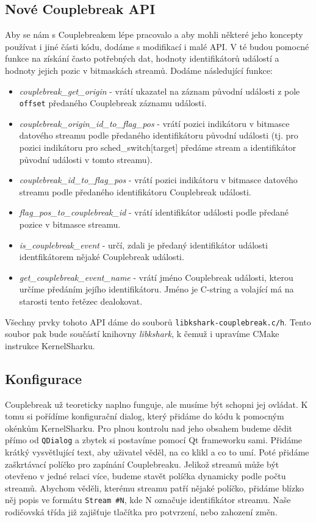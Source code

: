 \subsection{Nové Couplebreak API}
Aby se nám s Couplebreakem lépe pracovalo a aby mohli některé jeho koncepty používat i jiné části kódu, dodáme s modifikací i malé API. V té budou pomocné funkce na získání často potřebných dat, hodnoty identifikátorů událostí a hodnoty jejich pozic v bitmaskách streamů. Dodáme následující funkce:
\begin{itemize}
    \item \emph{couplebreak\_get\_origin} - vrátí ukazatel na záznam původní události z pole \texttt{offset} předaného Couplebreak záznamu události.
    \item \emph{couplebreak\_origin\_id\_to\_flag\_pos} - vrátí pozici indikátoru v bitmasce datového streamu podle předaného identifikátoru původní události (tj. pro pozici indikátoru pro sched\_switch[target] předáme stream a identifikátor původní události v tomto streamu).
    \item \emph{couplebreak\_id\_to\_flag\_pos} - vrátí pozici indikátoru v bitmasce datového streamu podle předaného identifikátoru Couplebreak události.
    \item \emph{flag\_pos\_to\_couplebreak\_id} - vrátí identifikátor události podle předané pozice v bitmasce streamu.
    \item \emph{is\_couplebreak\_event} - určí, zdali je předaný identifikátor události identfikátorem nějaké Couplebreak události.
    \item \emph{get\_couplebreak\_event\_name} - vrátí jméno Couplebreak události, kterou určíme předáním jejího identifikátoru. Jméno je C-string a volající má na starosti tento řetězec dealokovat.
\end{itemize}

Všechny prvky tohoto API dáme do souborů \texttt{libkshark-couplebreak.c/h}. Tento soubor pak bude součástí knihovny \emph{libkshark}, k čemuž i upravíme CMake instrukce KernelSharku.

\subsection{Konfigurace}
\label{cbreak-cfg-subsec}
Couplebreak už teoreticky naplno funguje, ale musíme být schopni jej ovládat. K tomu si pořídíme konfigurační dialog, který přidáme do kódu k pomocným okénkům KernelSharku. Pro plnou kontrolu nad jeho obsahem budeme dědit přímo od \texttt{QDialog} a zbytek si postavíme pomocí Qt frameworku sami. Přidáme krátký vysvětlující text, aby uživatel věděl, na co klikl a co to umí. Poté přidáme zaškrtávací políčko pro zapínání Couplebreaku. Jelikož streamů může být otevřeno v jedné relaci více, budeme stavět políčka dynamicky podle počtu streamů. Abychom věděli, kterému streamu patří nějaké políčko, přidáme blízko něj popis ve formátu \texttt{Stream \#N}, kde N označuje identifikátor streamu. Naše rodičovská třída již zajišťuje tlačítka pro potvrzení, nebo zahození změn.

